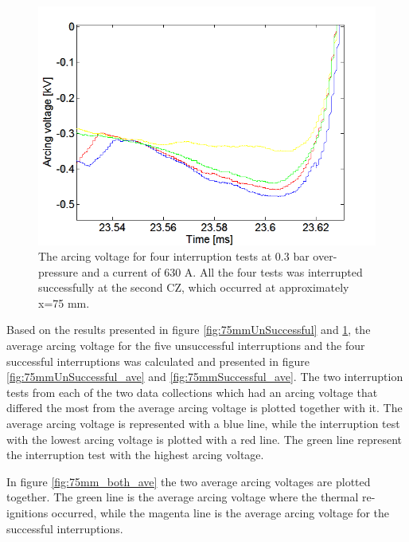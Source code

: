 \documentclass[10pt,b5paper,twoside]{article}
\begin{document}
\begin{figure}[H]
\centering
\includegraphics[scale=0.6, angle =0 ]{Bilder/Results/ArcingVoltage_75_none_reIgnition.PNG}
\caption{The arcing voltage for four interruption tests at 0.3 bar over-pressure and a current of 630 A. All the four tests was interrupted successfully at the second CZ, which occurred at approximately  x=75 mm.} \label{fig:75mmSuccessful}
\end{figure}

Based on the results presented in figure \ref{fig:75mmUnSuccessful} and \ref{fig:75mmSuccessful}, the average arcing voltage for the five unsuccessful interruptions and the four successful interruptions was calculated and presented in figure \ref{fig:75mmUnSuccessful_ave} and \ref{fig:75mmSuccessful_ave}. The two interruption tests from each of the two data collections which had an arcing voltage that differed the most from the average arcing voltage is plotted together with it. The average arcing voltage is represented with a blue line, while the interruption test with the lowest arcing voltage is plotted with a red line. The green line represent the interruption test with the highest arcing voltage. 

In figure \ref{fig:75mm_both_ave} the two average arcing voltages are plotted together. The green line is the average arcing voltage where the thermal re-ignitions occurred, while the magenta line is the average arcing voltage for the successful interruptions.
\end{document}
